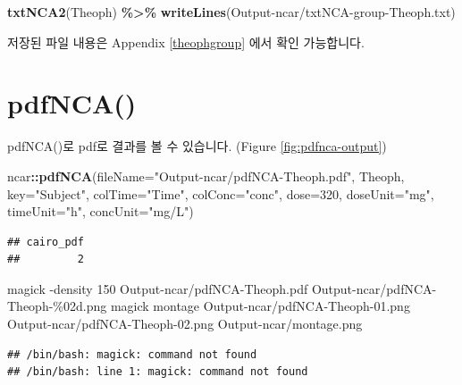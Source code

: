 \documentclass[
  10pt,
]{krantz}
\makeatletter
\newenvironment{Shaded}{\begin{snugshade}}{\end{snugshade}}
\newcommand{\DataTypeTok}[1]{\textcolor[rgb]{0.13,0.29,0.53}{#1}}
\newcommand{\DecValTok}[1]{\textcolor[rgb]{0.00,0.00,0.81}{#1}}
\newcommand{\ExtensionTok}[1]{#1}
\newcommand{\KeywordTok}[1]{\textcolor[rgb]{0.13,0.29,0.53}{\textbf{#1}}}
\newcommand{\NormalTok}[1]{#1}
\newcommand{\OperatorTok}[1]{\textcolor[rgb]{0.81,0.36,0.00}{\textbf{#1}}}
\newcommand{\StringTok}[1]{\textcolor[rgb]{0.31,0.60,0.02}{#1}}
\newenvironment{kframe}{%
\medskip{}
\setlength{\fboxsep}{.8em}
 \def\at@end@of@kframe{}%
 \ifinner\ifhmode%
  \def\at@end@of@kframe{\end{minipage}}%
  \begin{minipage}{\columnwidth}%
 \fi\fi%
 \def\FrameCommand##1{\hskip\@totalleftmargin \hskip-\fboxsep
 \colorbox{shadecolor}{##1}\hskip-\fboxsep
     \hskip-\linewidth \hskip-\@totalleftmargin \hskip\columnwidth}%
 \MakeFramed {\advance\hsize-\width
   \@totalleftmargin\z@ \linewidth\hsize
   \@setminipage}}%
 {\par\unskip\endMakeFramed%
 \at@end@of@kframe}
\renewenvironment{Shaded}{\begin{kframe}}{\end{kframe}}
\makeatother
\begin{document}
\begin{Shaded}
\begin{Highlighting}[]
\KeywordTok{txtNCA2}\NormalTok{(Theoph) }\OperatorTok{\%\textgreater{}\%}\StringTok{ }\KeywordTok{writeLines}\NormalTok{(}\StringTok{\textquotesingle{}Output{-}ncar/txtNCA{-}group{-}Theoph.txt\textquotesingle{}}\NormalTok{)}
\end{Highlighting}
\end{Shaded}

저장된 파일 내용은 Appendix \ref{theophgroup} 에서 확인 가능합니다.

\hypertarget{pdfnca}{%
\section{pdfNCA()}\label{pdfnca}}

pdfNCA()로 pdf로 결과를 볼 수 있습니다. (Figure \ref{fig:pdfnca-output})

\begin{Shaded}
\begin{Highlighting}[]
\NormalTok{ncar}\OperatorTok{::}\KeywordTok{pdfNCA}\NormalTok{(}\DataTypeTok{fileName=}\StringTok{"Output{-}ncar/pdfNCA{-}Theoph.pdf"}\NormalTok{, Theoph, }\DataTypeTok{key=}\StringTok{"Subject"}\NormalTok{, }
             \DataTypeTok{colTime=}\StringTok{"Time"}\NormalTok{,  }\DataTypeTok{colConc=}\StringTok{"conc"}\NormalTok{, }\DataTypeTok{dose=}\DecValTok{320}\NormalTok{, }\DataTypeTok{doseUnit=}\StringTok{"mg"}\NormalTok{, }
             \DataTypeTok{timeUnit=}\StringTok{"h"}\NormalTok{, }\DataTypeTok{concUnit=}\StringTok{"mg/L"}\NormalTok{)}
\end{Highlighting}
\end{Shaded}

\begin{verbatim}
## cairo_pdf 
##         2
\end{verbatim}

\begin{Shaded}
\begin{Highlighting}[]
\ExtensionTok{magick}\NormalTok{ {-}density 150 Output{-}ncar/pdfNCA{-}Theoph.pdf Output{-}ncar/pdfNCA{-}Theoph{-}\%02d.png}
\ExtensionTok{magick}\NormalTok{ montage Output{-}ncar/pdfNCA{-}Theoph{-}01.png Output{-}ncar/pdfNCA{-}Theoph{-}02.png Output{-}ncar/montage.png}
\end{Highlighting}
\end{Shaded}

\begin{verbatim}
## /bin/bash: magick: command not found
## /bin/bash: line 1: magick: command not found
\end{verbatim}
\end{document}
